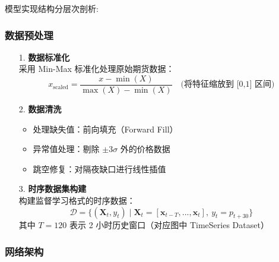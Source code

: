 \documentclass[a4paper,11pt]{ctexart}
\begin{document}
模型实现结构分层次剖析:

\subsubsection{数据预处理}
\begin{itemize}
  \item[1.] \textbf{数据标准化} \\
  采用 Min-Max 标准化处理原始期货数据：
  \begin{equation}
  x_{\text{scaled}} = \frac{x - \min(X)}{\max(X) - \min(X)} \quad \text{(将特征缩放到 [0,1] 区间)}
  \end{equation}

  \item[2.] \textbf{数据清洗}
  \begin{itemize}
    \item 处理缺失值：前向填充（Forward Fill）
    \item 异常值处理：剔除 $\pm 3\sigma$ 外的价格数据
    \item 跳空修复：对隔夜缺口进行线性插值
  \end{itemize}

  \item[3.] \textbf{时序数据集构建} \\
  构建监督学习格式的时序数据：
  \begin{equation}
  \mathcal{D} = \{ (\mathbf{X}_t, y_t) \mid \mathbf{X}_t = [\mathbf{x}_{t-T}, ..., \mathbf{x}_t], \ y_t = p_{t+30} \}
  \end{equation}
  其中 $T=120$ 表示 2 小时历史窗口（对应图中 TimeSeries Dataset）
\end{itemize}


\subsubsection{网络架构}
\end{document}
